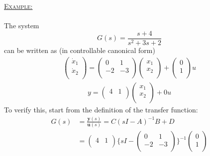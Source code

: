 \documentclass[12pt,a4paper]{article}
\begin{document}
\begin{itemize}
\begin{tcolorbox}[breakable]%
\underline{\textsc{Example:}}\\\\
The system
\[G(s) = \frac{s+4}{s^{2}+3s+2}\]
can be written as (in controllable canonical form)
\begin{gather*}
\begin{pmatrix}
\dot{x}_{1}\\
\dot{x}_{2}\\
\end{pmatrix} = 
\begin{pmatrix}
0&1\\
-2&-3\\
\end{pmatrix}
\begin{pmatrix}
x_{1}\\
x_{2}\\
\end{pmatrix}
+
\begin{pmatrix}
0\\
1\\
\end{pmatrix}u
\end{gather*}
\begin{gather*}
y = 
\begin{pmatrix}
4&1\\
\end{pmatrix}
\begin{pmatrix}
x_{1}\\
x_{2}\\
\end{pmatrix}
+0u
\end{gather*}
To verify this, start from the definition of the transfer function:
\begin{equation*}
\begin{aligned}
G(s) &= \frac{\mathbf{y}(s)}{\mathbf{u}(s)} = C(sI-A)^{-1}B+D\\
&= \begin{pmatrix}
 4 & 1\\
\end{pmatrix}
\{sI-\begin{pmatrix}
0&1\\
-2&-3\\
\end{pmatrix}
\}^{-1}
\begin{pmatrix}
0\\
1\\
\end{pmatrix}\\

\end{aligned}
\end{equation*}
\end{tcolorbox}
\end{itemize}
\end{document}
